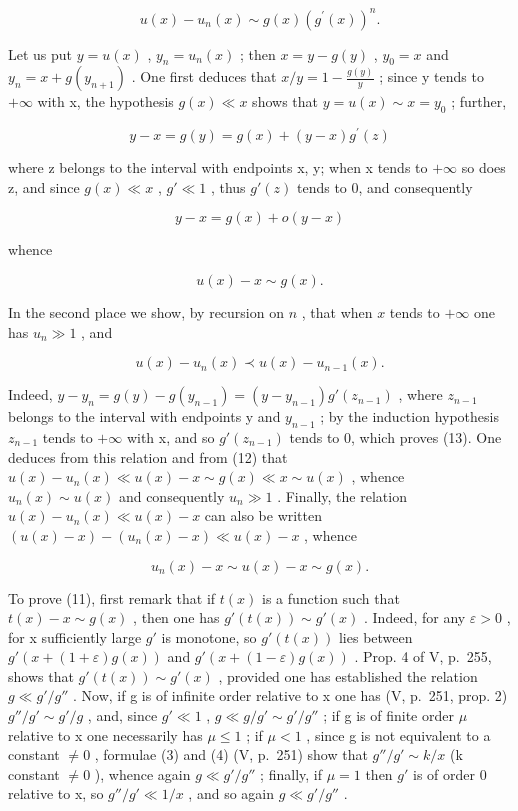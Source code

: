\[
u (x) - u _ {n} (x) \sim g (x) \left(g ^ {\prime} (x)\right) ^ {n}.\tag{11}
\]

Let us put \(y = u(x)\) , \(y_{n} = u_{n}(x)\) ; then \(x = y - g(y)\) , \(y_{0} = x\) and \(y_{n} = x + g(y_{n+1})\) . One first deduces that \(x/y = 1 - \frac{g(y)}{y}\) ; since y tends to \(+\infty\) with x, the hypothesis \(g(x) \ll x\) shows that \(y = u(x) \sim x = y_{0}\) ; further,

\[
y - x = g (y) = g (x) + (y - x) g ^ {\prime} (z)
\]

where z belongs to the interval with endpoints x, y; when x tends to \(+\infty\) so does z, and since \(g(x) \ll x\) , \(g' \ll 1\) , thus \(g'(z)\) tends to 0, and consequently

\[
y - x = g (x) + o (y - x)
\]

whence

\[
u (x) - x \sim g (x).\tag{12}
\]

In the second place we show, by recursion on \(n\) , that when \(x\) tends to \(+\infty\) one has \(u_{n} \gg 1\) , and

\[
u (x) - u _ {n} (x) \prec u (x) - u _ {n - 1} (x).\tag{13}
\]

Indeed, \(y - y_{n} = g(y) - g(y_{n-1}) = (y - y_{n-1})g'(z_{n-1})\) , where \(z_{n-1}\) belongs to the interval with endpoints y and \(y_{n-1}\) ; by the induction hypothesis \(z_{n-1}\) tends to \(+\infty\) with x, and so \(g'(z_{n-1})\) tends to 0, which proves (13). One deduces from this relation and from (12) that \(u(x) - u_{n}(x) \ll u(x) - x \sim g(x) \ll x \sim u(x)\) , whence \(u_{n}(x) \sim u(x)\) and consequently \(u_{n} \gg 1\) . Finally, the relation \(u(x) - u_{n}(x) \ll u(x) - x\) can also be written \((u(x) - x) - (u_{n}(x) - x) \ll u(x) - x\) , whence

\[
u _ {n} (x) - x \sim u (x) - x \sim g (x).\tag{14}
\]

To prove (11), first remark that if \(t(x)\) is a function such that \(t(x) - x \sim g(x)\) , then one has \(g'(t(x)) \sim g'(x)\) . Indeed, for any \(\varepsilon > 0\) , for x sufficiently large \(g'\) is monotone, so \(g'(t(x))\) lies between \(g'(x + (1 + \varepsilon)g(x))\) and \(g'(x + (1 - \varepsilon)g(x))\) . Prop. 4 of V, p.~255, shows that \(g'(t(x)) \sim g'(x)\) , provided one has established the relation \(g \ll g'/g''\) . Now, if g is of infinite order relative to x one has (V, p.~251, prop. 2) \(g''/g' \sim g'/g\) , and, since \(g' \ll 1\) , \(g \ll g/g' \sim g'/g''\) ; if g is of finite order \(\mu\) relative to x one necessarily has \(\mu \leqslant 1\) ; if \(\mu < 1\) , since g is not equivalent to a constant \(\neq 0\) , formulae (3) and (4) (V, p.~251) show that \(g''/g' \sim k/x\) (k constant \(\neq 0\) ), whence again \(g \ll g'/g''\) ; finally, if \(\mu = 1\) then \(g'\) is of order 0 relative to x, so \(g''/g' \ll 1/x\) , and so again \(g \ll g'/g''\) .

